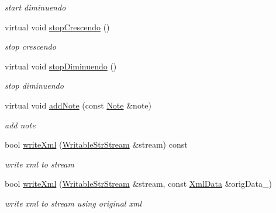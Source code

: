 \begin{DoxyCompactItemize}
\begin{DoxyCompactList}\small\item\em start diminuendo \end{DoxyCompactList}\item 
\hypertarget{classsinsy_1_1XmlWriter_a37018ef9f5d8bb816c0b3281033a9262}{virtual void \hyperlink{classsinsy_1_1XmlWriter_a37018ef9f5d8bb816c0b3281033a9262}{stop\-Crescendo} ()}\label{classsinsy_1_1XmlWriter_a37018ef9f5d8bb816c0b3281033a9262}

\begin{DoxyCompactList}\small\item\em stop crescendo \end{DoxyCompactList}\item 
\hypertarget{classsinsy_1_1XmlWriter_a9c5ebcc1a7936584655980894e21b330}{virtual void \hyperlink{classsinsy_1_1XmlWriter_a9c5ebcc1a7936584655980894e21b330}{stop\-Diminuendo} ()}\label{classsinsy_1_1XmlWriter_a9c5ebcc1a7936584655980894e21b330}

\begin{DoxyCompactList}\small\item\em stop diminuendo \end{DoxyCompactList}\item 
\hypertarget{classsinsy_1_1XmlWriter_a73938135557c30d8a0ce7f6e42388fb8}{virtual void \hyperlink{classsinsy_1_1XmlWriter_a73938135557c30d8a0ce7f6e42388fb8}{add\-Note} (const \hyperlink{classsinsy_1_1Note}{\-Note} \&note)}\label{classsinsy_1_1XmlWriter_a73938135557c30d8a0ce7f6e42388fb8}

\begin{DoxyCompactList}\small\item\em add note \end{DoxyCompactList}\item 
bool \hyperlink{classsinsy_1_1XmlWriter_aad09698ce393de49f083666ee26cfd0a}{write\-Xml} (\hyperlink{classsinsy_1_1WritableStrStream}{\-Writable\-Str\-Stream} \&stream) const 
\begin{DoxyCompactList}\small\item\em write xml to stream \end{DoxyCompactList}\item 
bool \hyperlink{classsinsy_1_1XmlWriter_aebe855c816e53dd765f461213d802608}{write\-Xml} (\hyperlink{classsinsy_1_1WritableStrStream}{\-Writable\-Str\-Stream} \&stream, const \hyperlink{classsinsy_1_1XmlData}{\-Xml\-Data} \&orig\-Data\-\_\-)
\begin{DoxyCompactList}\small\item\em write xml to stream using original xml \end{DoxyCompactList}\end{DoxyCompactItemize}


